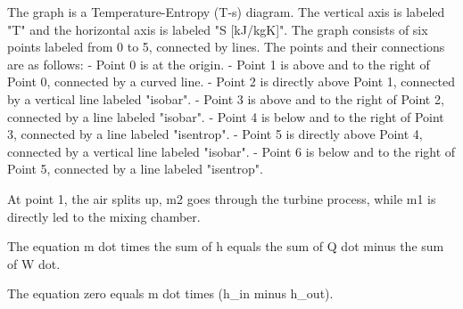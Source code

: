The graph is a Temperature-Entropy (T-s) diagram. The vertical axis is labeled "T" and the horizontal axis is labeled "S [kJ/kgK]". The graph consists of six points labeled from 0 to 5, connected by lines. The points and their connections are as follows:
- Point 0 is at the origin.
- Point 1 is above and to the right of Point 0, connected by a curved line.
- Point 2 is directly above Point 1, connected by a vertical line labeled "isobar".
- Point 3 is above and to the right of Point 2, connected by a line labeled "isobar".
- Point 4 is below and to the right of Point 3, connected by a line labeled "isentrop".
- Point 5 is directly above Point 4, connected by a vertical line labeled "isobar".
- Point 6 is below and to the right of Point 5, connected by a line labeled "isentrop".

At point 1, the air splits up, m2 goes through the turbine process, while m1 is directly led to the mixing chamber.

The equation m dot times the sum of h equals the sum of Q dot minus the sum of W dot.

The equation zero equals m dot times (h_in minus h_out).